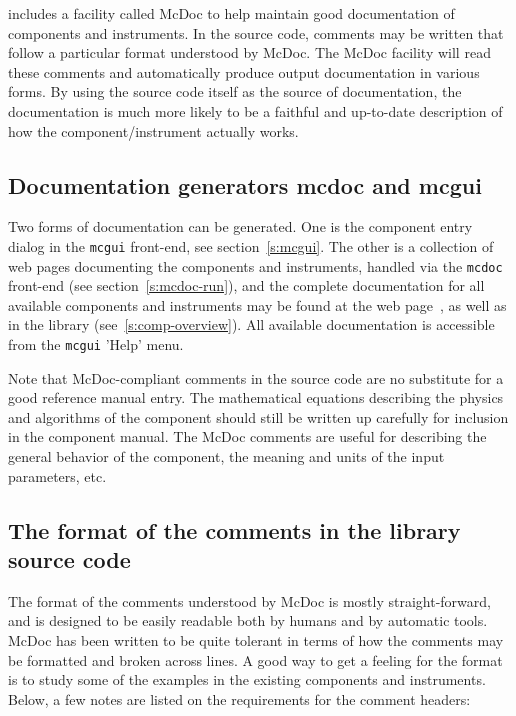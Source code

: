 \MCS includes a facility called McDoc to help maintain good documentation of
components and instruments. In the source code, comments may be
written that follow a particular format understood by McDoc. The McDoc facility
will read these comments and automatically produce output documentation in
various forms. By using the source code itself as the source of documentation,
the documentation is much more likely to be a faithful and up-to-date
description of how the component/instrument actually works.

\subsection{Documentation generators mcdoc and mcgui}

Two forms of documentation can be generated. One
is the component entry dialog in the \verb+mcgui+ front-end, see
section~\ref{s:mcgui}. The other is a collection of web pages documenting
the components and instruments, handled via the \verb+mcdoc+ front-end (see section~\ref{s:mcdoc-run}), and the complete documentation for all available
\MCS components and instruments may be found at the \MCS
web page~\cite{mcstas_webpage}, as well as in the \MCS library
(see~\ref{s:comp-overview}). All available \MCS documentation is accessible from the \verb+mcgui+ 'Help' menu.

Note that McDoc-compliant comments in the source code are no substitute
for a good reference manual entry. The mathematical equations describing
the physics and algorithms of the component should still be written up
carefully for inclusion in the component manual. The McDoc comments are
useful for describing the general behavior of the component, the
meaning and units of the input parameters, etc.


\subsection{The format of the comments in the library source code}

The format of the comments understood by McDoc is mostly
straight-forward, and is designed to be easily readable both by humans
and by automatic tools. McDoc has been written to be quite tolerant in
terms of how the comments may be formatted and broken across lines. A
good way to get a feeling for the format is to study some of the examples
in the existing components and instruments. Below, a few
notes are listed on the requirements for the comment headers:

